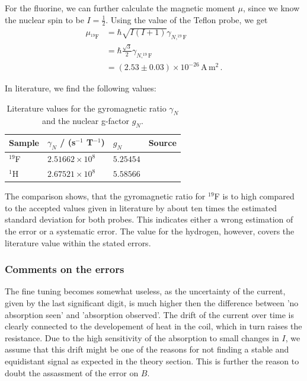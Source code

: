 For the fluorine, we can further calculate the magnetic moment $\mu$, since we know the 
nuclear spin to be $I = \frac{1}{2}$. Using the value of the Teflon probe, we get 
\begin{equation}
    \begin{split}
        \mu_{^{19}\mathrm{F}} &= \hbar \sqrt{I(I + 1)}  \gamma_{N, ^{19}\mathrm{F}} \\
            &= \hbar \frac{\sqrt{3}}{2}  \gamma_{N, ^{19}\mathrm{F}} \\
            &= \left(2.53 \pm 0.03\right) \times 10^{-26} \, \mathrm{A \, m^2}\, .
    \end{split}
\end{equation}

In literature, we find the following values:
\renewcommand{\arraystretch}{1.5}
\begin{table}[H]
\centering
\begin{tabular}{|p{3.82cm}|p{3.82cm}|p{3.82cm}|p{2.00cm}|}
        \hline
        \rowcolor{LightCyan}
        Sample & $\gamma_N$ / (s$^{-1}$ T$^{-1}$) & $g_N$ & Source\\ \hline
        $^{19}$F    & $ 2.51662 \times 10^{8}$  & $ 5.25454$ & \cite{nist}\\ 
        $^1$H       & $ 2.67521 \times 10^{8}$  & $ 5.58566$ & \cite{crc}\\
        \hline
    \end{tabular}
    \caption{
        Literature values for the gyromagnetic ratio $\gamma_N$ and the nuclear g-factor $g_N$.
        }
    \label{tab:g_N}
\end{table}
The comparison shows, that the gyromagnetic ratio for $^{19}$F is to high compared to the 
accepted values given in literature by about ten times the estimated standard deviation for both probes. 
This indicates either a wrong estimation of the error or a systematic error. 
The value for the hydrogen, however, covers the literature value within the stated errors. 


\subsubsection{Comments on the errors}

The fine tuning becomes somewhat useless, as the uncertainty of the current, given by the last 
significant digit, is much higher then the difference between 'no absorption seen' and 
'absorption observed'. The drift of the current over time is clearly connected to the developement 
of heat in the coil, which in turn raises the resistance. Due to the high sensitivity of the absorption 
to small changes in $I$, we assume that this drift might be one of the reasons for not finding 
a stable and equidistant signal as expected in the theory section. This is further the reason to 
doubt the assassment of the error on $B$. 





